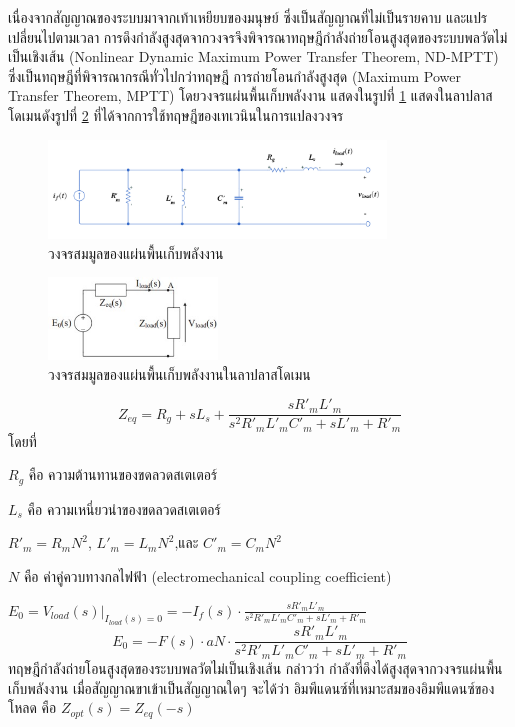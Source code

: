 \documentclass[11pt,a4paper]{article}
\begin{document}
เนื่องจากสัญญาณของระบบมาจากเท้าเหยียบของมนุษย์ ซึ่งเป็นสัญญาณที่ไม่เป็นรายคาบ และแปรเปลี่ยนไปตามเวลา การดึงกำลังสูงสุดจากวงจรจึงพิจารณาทฤษฎีกำลังถ่ายโอนสูงสุดของระบบพลวัตไม่เป็นเชิงเส้น (Nonlinear Dynamic Maximum Power Transfer Theorem, ND-MPTT) ซึ่งเป็นทฤษฎีที่พิจารณากรณีทั่วไปกว่าทฤษฎี การถ่ายโอนกำลังสูงสุด (Maximum Power Transfer Theorem, MPTT)
โดยวงจรแผ่นพื้นเก็บพลังงาน แสดงในรูปที่ \ref{harvest_circuit} แสดงในลาปลาสโดเมนดังรูปที่ \ref{laplce_genpath_circuit} ที่ได้จากการใช้ทฤษฎีของเทเวนินในการแปลงวงจร
\begin{figure}[H]
    \begin{center}
        \includegraphics[width=0.8\textwidth]{harvest_circuit.png}
    \end{center}
    \caption{วงจรสมมูลของแผ่นพื้นเก็บพลังงาน}
    \label{harvest_circuit}
\end{figure}
\begin{figure}[H]
    \begin{center}
        \includegraphics[width=0.4\textwidth]{laplce_genpath_circuit.jpg}
    \end{center}
    \caption{วงจรสมมูลของแผ่นพื้นเก็บพลังงานในลาปลาสโดเมน}
    \label{laplce_genpath_circuit}
\end{figure}
\begin{equation}\label{zeq}
    Z_{eq}  = R_{g} + sL_{s} + \frac{ sR'_{m}L'_{m} }{ s^2R'_{m}L'_{m}C'_{m} + sL'_{m} + R'_{m} }
\end{equation}
โดยที่

$R_{g}$ คือ ความต้านทานของขดลวดสเตเตอร์

$L_{s}$ คือ ความเหนี่ยวนำของขดลวดสเตเตอร์

$R'_{m} = R_{m}N^2$, $L'_{m} = L_{m}N^2$,และ $C'_{m} = C_{m}N^2$

$N$ คือ ค่าคู่ควบทางกลไฟฟ้า (electromechanical coupling coefficient)

$E_{0} = V_{load}(s)\vert_{I_{load}(s) = 0} = -I_{f}(s) \cdot \frac{ sR'_{m}L'_{m} }{ s^2R'_{m}L'_{m}C'_{m} + sL'_{m} + R'_{m}}$
\begin{equation}\label{E0}
    E_{0} = -F(s) \cdot aN \cdot \frac{ sR'_{m}L'_{m} }{ s^2R'_{m}L'_{m}C'_{m} + sL'_{m} + R'_{m}}
\end{equation}
ทฤษฎีกำลังถ่ายโอนสูงสุดของระบบพลวัตไม่เป็นเชิงเส้น กล่าวว่า กำลังที่ดึงได้สูงสุดจากวงจรแผ่นพื้นเก็บพลังงาน เมื่อสัญญาณขาเข้าเป็นสัญญาณใดๆ จะได้ว่า อิมพีแดนซ์ที่เหมาะสมของอิมพีแดนซ์ของโหลด คือ
$Z_{opt}(s)= Z_{eq}(-s)$
\end{document}

